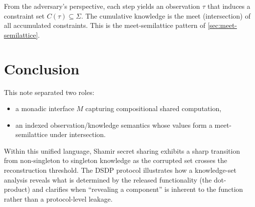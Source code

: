 \documentclass[11pt,a4paper]{article}
\theoremstyle{definition}
\theoremstyle{remark}
\begin{document}
From the adversary's perspective, each step yields an observation \(\tau\) that induces a constraint set \(C(\tau)\subseteq \Sigma\). The cumulative knowledge is the meet (intersection) of all accumulated constraints. This is the meet-semilattice pattern of \cref{sec:meet-semilattice}.

\section{Conclusion}
\label{sec:conclusion}

This note separated two roles:
\begin{itemize}[leftmargin=2em]
  \item a monadic interface \(M\) capturing compositional shared computation,
  \item an indexed observation/knowledge semantics whose values form a meet-semilattice under intersection.
\end{itemize}
Within this unified language, Shamir secret sharing exhibits a sharp transition from non-singleton to singleton knowledge as the corrupted set crosses the reconstruction threshold. The DSDP protocol illustrates how a knowledge-set analysis reveals what is determined by the released functionality (the dot-product) and clarifies when ``revealing a component'' is inherent to the function rather than a protocol-level leakage.



\end{document}
